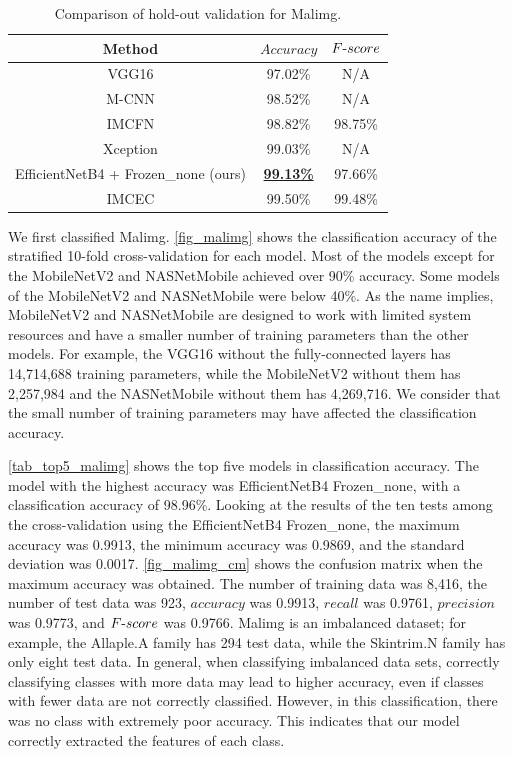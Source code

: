 \documentclass[conference]{IEEEtran}
\begin{document}
\begin{table}[t!]
	\caption{Comparison of hold-out validation for Malimg.}
	\label{tab_comparison_malimg_hold}
	\centering
	\begin{tabular}{ccc}
		\toprule
		Method & $Accuracy$ & $F\mathchar`-score$\\
		\midrule
VGG16 \cite{10.1145/3320326.3320333} & 97.02\% & N/A \\
M-CNN \cite{8328749} & 98.52\% & N/A\\
IMCFN \cite{VASAN2020107138} & 98.82\% & 98.75\% \\
Xception \cite{8763852} & 99.03\% & N/A \\
EfficientNetB4 + Frozen\_none (ours)& \textbf{\underline{99.13\%}} & 97.66\%  \\
IMCEC \cite{VASAN2020101748} & 99.50\% & 99.48\% \\
		\bottomrule
	\end{tabular}
\end{table}

We first classified Malimg.
\autoref{fig_malimg} shows the classification accuracy of the stratified 10-fold cross-validation for each model.
Most of the models except for the MobileNetV2 and NASNetMobile achieved over 90\% accuracy. Some models of the MobileNetV2 and NASNetMobile were below 40\%.
As the name implies, MobileNetV2 and NASNetMobile are designed to work with limited system resources and have a smaller number of training parameters than the other models. For example, the VGG16 without the fully-connected layers has 14,714,688 training parameters, while the MobileNetV2 without them has 2,257,984 and the NASNetMobile without them has 4,269,716. 
We consider that the small number of training parameters may have affected the classification accuracy.

\autoref{tab_top5_malimg} shows the top five models in classification accuracy. 
The model with the highest accuracy was EfficientNetB4 Frozen\_none, with a classification accuracy of 98.96\%.
Looking at the results of the ten tests among the cross-validation using the EfficientNetB4 Frozen\_none, the maximum accuracy was 0.9913, the minimum accuracy was 0.9869, and the standard deviation was 0.0017. 
\autoref{fig_malimg_cm} shows the confusion matrix when the maximum accuracy was obtained. The number of training data was 8,416, the number of test data was 923, $accuracy$ was 0.9913, $recall$ was 0.9761, $precision$ was 0.9773, and $F\mathchar`-score$ was 0.9766. Malimg is an imbalanced dataset; for example, the Allaple.A family has 294 test data, while the Skintrim.N family has only eight test data. 
In general, when classifying imbalanced data sets, correctly classifying classes with more data may lead to higher accuracy, even if classes with fewer data are not correctly classified. However, in this classification, there was no class with extremely poor accuracy. 
This indicates that our model correctly extracted the features of each class.
\end{document}
